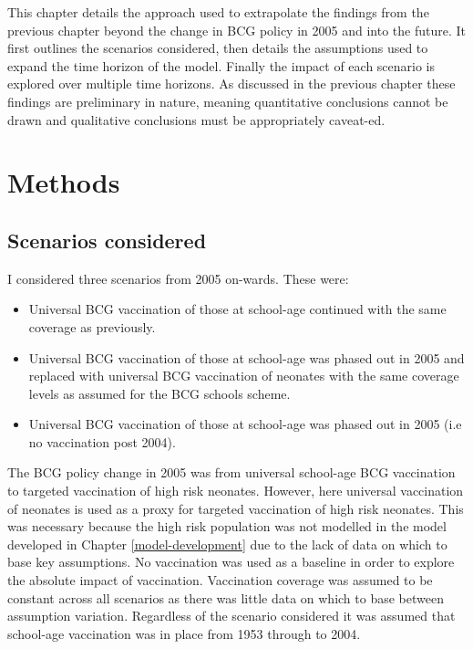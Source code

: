 \documentclass[11pt,twoside]{bristolthesis}
\providecommand{\tightlist}{%
  \setlength{\itemsep}{0pt}\setlength{\parskip}{0pt}}
\begin{document}
  This chapter details the approach used to extrapolate the findings from the previous chapter beyond the change in BCG policy in 2005 and into the future. It first outlines the scenarios considered, then details the assumptions used to expand the time horizon of the model. Finally the impact of each scenario is explored over multiple time horizons. As discussed in the previous chapter these findings are preliminary in nature, meaning quantitative conclusions cannot be drawn and qualitative conclusions must be appropriately caveat-ed.
  
  \hypertarget{methods-2}{%
  \section{Methods}\label{methods-2}}
  
  \hypertarget{scenarios-considered}{%
  \subsection{Scenarios considered}\label{scenarios-considered}}
  
  I considered three scenarios from 2005 on-wards. These were:
  \begin{itemize}
  \tightlist
  \item
    Universal BCG vaccination of those at school-age continued with the same coverage as previously.
  \item
    Universal BCG vaccination of those at school-age was phased out in 2005 and replaced with universal BCG vaccination of neonates with the same coverage levels as assumed for the BCG schools scheme.
  \item
    Universal BCG vaccination of those at school-age was phased out in 2005 (i.e no vaccination post 2004).
  \end{itemize}
  The BCG policy change in 2005 was from universal school-age BCG vaccination to targeted vaccination of high risk neonates. However, here universal vaccination of neonates is used as a proxy for targeted vaccination of high risk neonates. This was necessary because the high risk population was not modelled in the model developed in Chapter \ref{model-development} due to the lack of data on which to base key assumptions. No vaccination was used as a baseline in order to explore the absolute impact of vaccination. Vaccination coverage was assumed to be constant across all scenarios as there was little data on which to base between assumption variation. Regardless of the scenario considered it was assumed that school-age vaccination was in place from 1953 through to 2004.
  
\end{document}
